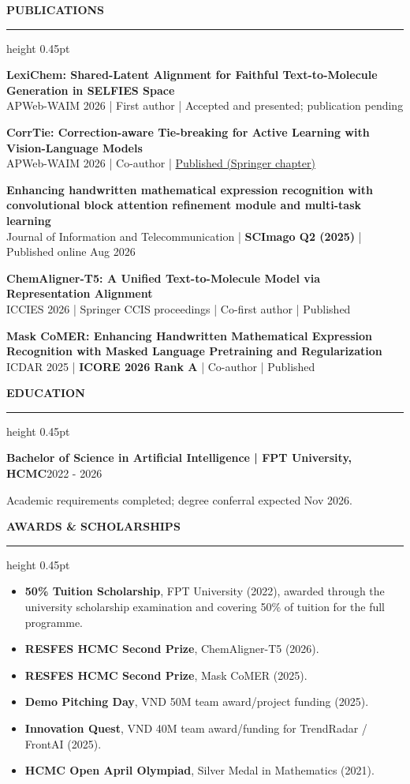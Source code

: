 \documentclass[10pt]{article}
\newcommand{\cvsection}[1]{%
    \vspace{6.2pt}%
    {\color{accent}\bfseries\small #1}\par
    \vspace{2.3pt}%
    {\color{rulegray}\hrule height 0.45pt}\vspace{4.0pt}%
}
\newcommand{\entry}[2]{%
    \textbf{#1}\hfill {\color{muted}\small #2}\par
}
\begin{document}
\cvsection{PUBLICATIONS}
\textbf{LexiChem: Shared-Latent Alignment for Faithful Text-to-Molecule Generation in SELFIES Space}\\[-1pt]
{\small APWeb-WAIM 2026 | First author | Accepted and presented; publication pending}\par
\vspace{2.8pt}
\textbf{CorrTie: Correction-aware Tie-breaking for Active Learning with Vision-Language Models}\\[-1pt]
{\small APWeb-WAIM 2026 | Co-author | \href{https://doi.org/10.1007/978-981-92-5699-0_26}{Published (Springer chapter)}}\par
\vspace{2.8pt}
\textbf{Enhancing handwritten mathematical expression recognition with convolutional block attention refinement module and multi-task learning}\\[-1pt]
{\small Journal of Information and Telecommunication | \textbf{SCImago Q2 (2025)} | Published online Aug 2026}\par
\vspace{2.8pt}
\textbf{ChemAligner-T5: A Unified Text-to-Molecule Model via Representation Alignment}\\[-1pt]
{\small ICCIES 2026 | Springer CCIS proceedings | Co-first author | Published}\par
\vspace{2.8pt}
\textbf{Mask CoMER: Enhancing Handwritten Mathematical Expression Recognition with Masked Language Pretraining and Regularization}\\[-1pt]
{\small ICDAR 2025 | \textbf{ICORE 2026 Rank A} | Co-author | Published}

\cvsection{EDUCATION}
\entry{Bachelor of Science in Artificial Intelligence | FPT University, HCMC}{2022 - 2026}
{\small Academic requirements completed; degree conferral expected Nov 2026.}

\cvsection{AWARDS \& SCHOLARSHIPS}
\begin{itemize}
    \item \textbf{50\% Tuition Scholarship}, FPT University (2022), awarded through the university scholarship examination and covering 50\% of tuition for the full programme.
    \item \textbf{RESFES HCMC Second Prize}, ChemAligner-T5 (2026).
    \item \textbf{RESFES HCMC Second Prize}, Mask CoMER (2025).
    \item \textbf{Demo Pitching Day}, VND 50M team award/project funding (2025).
    \item \textbf{Innovation Quest}, VND 40M team award/funding for TrendRadar / FrontAI (2025).
    \item \textbf{HCMC Open April Olympiad}, Silver Medal in Mathematics (2021).
\end{itemize}
\end{document}
